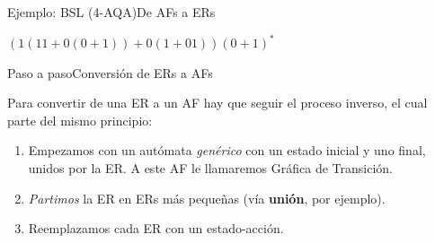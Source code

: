 \documentclass[spanish]{beamer}
\begin{document}
\begin{frame}{Ejemplo: BSL (4-AQA)}{De AFs a ERs}
    \begin{center}
        {\huge $(1(11 + 0(0+1)) + 0(1 + 01))(0+1)^*$}
    \end{center}
\end{frame}

\begin{frame}{Paso a paso}{Conversión de ERs a AFs}
    
    Para convertir de una ER a un AF hay que seguir el proceso inverso, el cual parte del mismo principio:

    \bigskip

    \begin{enumerate}
        \itemsep1.5em
        \item Empezamos con un autómata \textit{genérico} con un estado inicial y uno final, unidos por la ER. A este AF le llamaremos \alert{Gráfica de Transición}. \pause
        \item \textit{Partimos} la ER en ERs más pequeñas (vía \textbf{unión}, por ejemplo).
        \item Reemplazamos cada ER con un estado-acción.
    \end{enumerate}
\end{frame}
\end{document}
